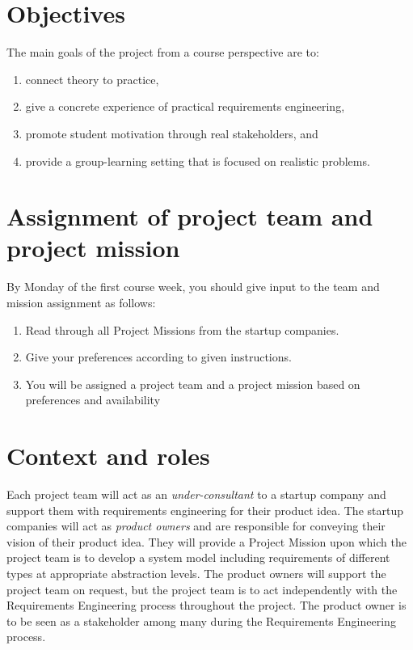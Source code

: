 \maketitle
\vspace{-1cm}

\section{Objectives}
The main goals of the project from a course perspective are to:
\begin{enumerate}[noitemsep]
\item connect theory to practice,
\item give a concrete experience of practical requirements engineering,
\item promote student motivation through real stakeholders, and
\item provide a group-learning setting that is focused on realistic problems.
\end{enumerate}

\section{Assignment of project team and project mission}
By Monday of the first course week, you should give input to the team and mission
assignment as follows:
\begin{enumerate}[noitemsep]
\item Read through all Project Missions from the startup companies.
\item  Give your preferences according to given instructions.
\item  You will be assigned a project team and a project mission based on preferences
and availability
\end{enumerate}

\ifteknolog
\section{Context and roles}

\noindent Each project team will act as an \textit{under-consultant} to a startup company and support them with requirements engineering for their product idea. The startup companies will act as \textit{product owners} and are responsible for conveying their vision of their product idea. They will provide a Project Mission upon which the project team is to develop a system model including requirements of different types at appropriate abstraction levels. The product owners will support the project team on request, but the project team is to act independently with the Requirements Engineering process throughout the project. The product owner is to be seen as a stakeholder among many during the Requirements Engineering process.
\newline

